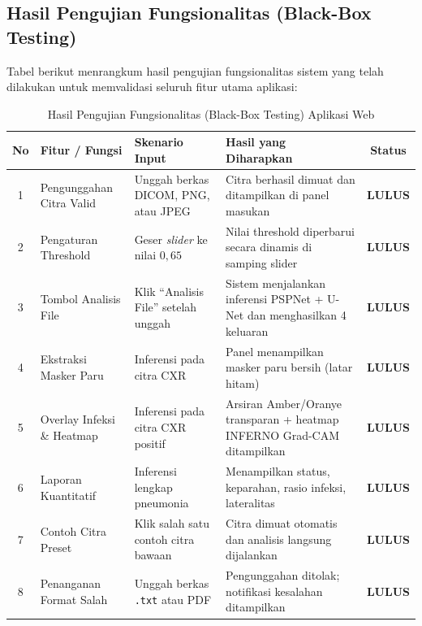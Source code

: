 \documentclass[12pt,a4paper]{article}
\begin{document}
\subsection{Hasil Pengujian Fungsionalitas (Black-Box Testing)}

Tabel berikut menrangkum hasil pengujian fungsionalitas sistem yang telah
dilakukan untuk memvalidasi seluruh fitur utama aplikasi:

\begin{table}[H]
\centering
\caption{Hasil Pengujian Fungsionalitas (Black-Box Testing) Aplikasi Web}
\begin{tabularx}{\textwidth}{c p{3cm} X X c}
\toprule
\textbf{No} & \textbf{Fitur / Fungsi} & \textbf{Skenario Input} & \textbf{Hasil yang Diharapkan} & \textbf{Status} \\
\midrule
1 & Pengunggahan Citra Valid      & Unggah berkas DICOM, PNG, atau JPEG      & Citra berhasil dimuat dan ditampilkan di panel masukan          & \textbf{LULUS} \\
2 & Pengaturan Threshold          & Geser \textit{slider} ke nilai $0{,}65$  & Nilai threshold diperbarui secara dinamis di samping slider     & \textbf{LULUS} \\
3 & Tombol Analisis File          & Klik ``Analisis File'' setelah unggah    & Sistem menjalankan inferensi PSPNet + U-Net dan menghasilkan 4 keluaran & \textbf{LULUS} \\
4 & Ekstraksi Masker Paru         & Inferensi pada citra CXR                 & Panel menampilkan masker paru bersih (latar hitam)              & \textbf{LULUS} \\
5 & Overlay Infeksi \& Heatmap    & Inferensi pada citra CXR positif         & Arsiran Amber/Oranye transparan + heatmap INFERNO Grad-CAM ditampilkan     & \textbf{LULUS} \\
6 & Laporan Kuantitatif           & Inferensi lengkap pneumonia              & Menampilkan status, keparahan, rasio infeksi, lateralitas       & \textbf{LULUS} \\
7 & Contoh Citra Preset           & Klik salah satu contoh citra bawaan      & Citra dimuat otomatis dan analisis langsung dijalankan          & \textbf{LULUS} \\
8 & Penanganan Format Salah       & Unggah berkas \texttt{.txt} atau PDF     & Pengunggahan ditolak; notifikasi kesalahan ditampilkan          & \textbf{LULUS} \\
\bottomrule
\end{tabularx}
\end{table}
\end{document}
